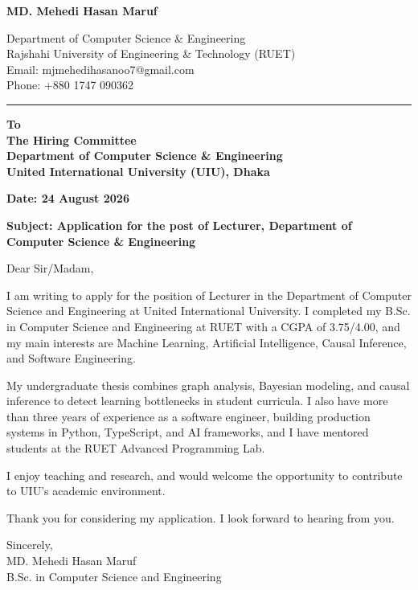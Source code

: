 \documentclass[11pt, a4paper]{article}
\begin{document}
{\Huge\bfseries MD. Mehedi Hasan Maruf}

\vspace{0.8em}
Department of Computer Science \& Engineering \\
Rajshahi University of Engineering \& Technology (RUET) \\
Email: mjmehedihasanoo7@gmail.com \\
Phone: +880 1747 090362

\vspace{0.6em}
\noindent\rule{\linewidth}{1.2pt}
\vspace{0.8em}

\begin{minipage}[t]{0.68\textwidth}
\textbf{To}\\
\textbf{The Hiring Committee}\\
\textbf{Department of Computer Science \& Engineering}\\
\textbf{United International University (UIU), Dhaka}
\end{minipage}\hfill
\begin{minipage}[t]{0.28\textwidth}
\raggedleft\textbf{Date: 24 August 2026}
\end{minipage}

\vspace{0.6em}
\textbf{Subject: Application for the post of Lecturer, Department of Computer Science \& Engineering}

Dear Sir/Madam,

I am writing to apply for the position of Lecturer in the Department of Computer Science and Engineering at United International University. I completed my B.Sc. in Computer Science and Engineering at RUET with a CGPA of 3.75/4.00, and my main interests are Machine Learning, Artificial Intelligence, Causal Inference, and Software Engineering.

My undergraduate thesis combines graph analysis, Bayesian modeling, and causal inference to detect learning bottlenecks in student curricula. I also have more than three years of experience as a software engineer, building production systems in Python, TypeScript, and AI frameworks, and I have mentored students at the RUET Advanced Programming Lab.

I enjoy teaching and research, and would welcome the opportunity to contribute to UIU's academic environment.

Thank you for considering my application. I look forward to hearing from you.

Sincerely,\\
MD. Mehedi Hasan Maruf\\
B.Sc. in Computer Science and Engineering
\end{document}
